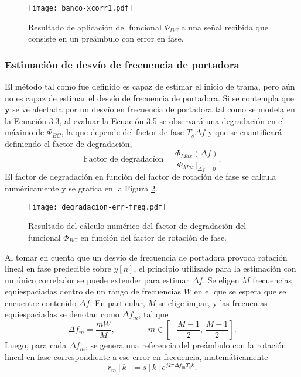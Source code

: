 \begin{figure}[t]
    \centering{}\texttt{[image: banco-xcorr1.pdf]}
    \caption[Aplicación del \color{RoyalBlue} funcional \color{black} $\Phi_{BC}$ a una señal recibida.]{Resultado de aplicación del \color{RoyalBlue} funcional \color{black} $\Phi_{BC}$ a una señal recibida que consiste en un preámbulo con error en fase.\label{fig:banco-xcorr1}}  
\end{figure}

\subsubsection{Estimación de desvío de frecuencia de portadora}
\label{Ss:ch3-banco-frecuencias}
El método tal como fue definido es capaz de estimar el inicio de trama, pero aún no es capaz de estimar el desvío de frecuencia de portadora. Si se contempla que $\mathbf{y}$ se ve afectada por un desvío en frecuencia de portadora tal como se modela en la Ecuación 3.3, al evaluar la Ecuación 3.5 se observará una degradación en el máximo de $\Phi_{BC}$, la que depende del factor de fase $T_s\Delta f$ y que se cuantificará definiendo el factor de degradación,
\begin{equation}
    \text{Factor de degradacíon} = \frac{\Phi_{Max}(\Delta f)}{\Phi_{Max}\lvert_{\Delta f = 0}}.
\end{equation}
El factor de degradación en función del factor de rotación de fase se calcula numéricamente y se grafica en la Figura \ref{fig:degradacion}.
\begin{figure}[t]
    \centering{}\texttt{[image: degradacion-err-freq.pdf]}
    \caption[Factor de degradación del \color{RoyalBlue} funcional \color{black} $\Phi_{BC}$ en función del factor de rotación de fase.]{Resultado del cálculo numérico del factor de degradación del \color{RoyalBlue} funcional \color{black} $\Phi_{BC}$ en función del factor de rotación de fase.\label{fig:degradacion}}  
\end{figure}


Al tomar en cuenta que un desvío de frecuencia de portadora provoca rotación lineal en fase predecible sobre $y[n]$, el principio utilizado para la estimación con un único correlador se puede extender para estimar $\Delta f$. Se eligen $M$ frecuencias equiespaciadas dentro de un rango de frecuencias $W$ en el que se espera que se encuentre contenido $\Delta f$. En particular, $M$ se elige impar, y las frecuenias equiespaciadas se denotan como $\Delta f_m$, tal que
\begin{equation}
    \Delta f_m = \frac{mW}{M}, \qquad\qquad m \in \left[-\frac{M-1}{2},\,\frac{M-1}{2}\right].
\end{equation}
Luego, para cada $\Delta f_m$, se genera una referencia del preámbulo con la rotación lineal en fase correspondiente a ese error en frecuencia, matemáticamente
\begin{equation}
    r_m[k] = s[k] e^{j2\pi \Delta f_m T_s k}.
\end{equation}

